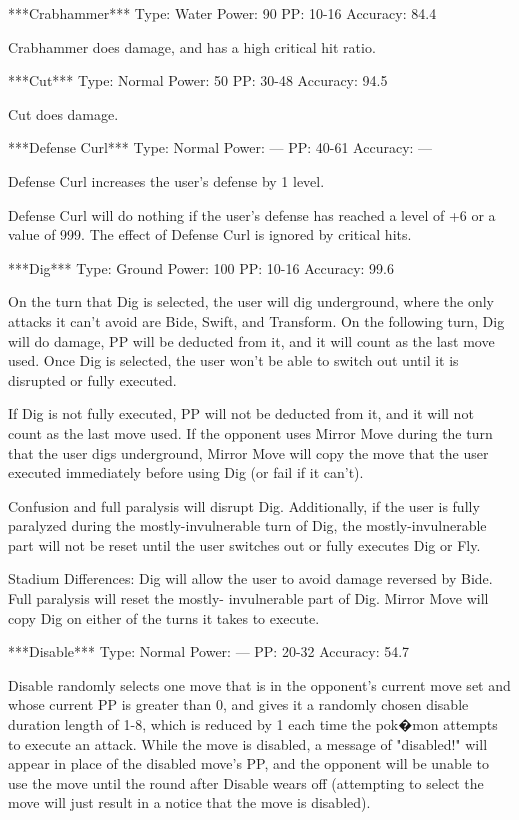 \documentclass[reprint, aps, prl, paper=A4]{revtex4-1}
\begin{document}
***Crabhammer***
Type: Water
Power: 90
PP: 10-16
Accuracy: 84.4%

Crabhammer does damage, and has a high critical hit ratio.


***Cut***
Type: Normal
Power: 50
PP: 30-48
Accuracy: 94.5%

Cut does damage.


***Defense Curl***
Type: Normal
Power: ---
PP: 40-61
Accuracy: ---

Defense Curl increases the user's defense by 1 level.

Defense Curl will do nothing if the user's defense has reached a level of +6 or a value of 999.
The effect of Defense Curl is ignored by critical hits.


***Dig***
Type: Ground
Power: 100
PP: 10-16
Accuracy: 99.6%

On the turn that Dig is selected, the user will dig underground, where the only attacks it
can't avoid are Bide, Swift, and Transform. On the following turn, Dig will do damage, PP will
be deducted from it, and it will count as the last move used. Once Dig is selected, the user
won't be able to switch out until it is disrupted or fully executed.

If Dig is not fully executed, PP will not be deducted from it, and it will not count as the
last move used. If the opponent uses Mirror Move during the turn that the user digs
underground, Mirror Move will copy the move that the user executed immediately before using Dig
(or fail if it can't).

Confusion and full paralysis will disrupt Dig. Additionally, if the user is fully paralyzed
during the mostly-invulnerable turn of Dig, the mostly-invulnerable part will not be reset
until the user switches out or fully executes Dig or Fly.

Stadium Differences:
Dig will allow the user to avoid damage reversed by Bide. Full paralysis will reset the mostly-
invulnerable part of Dig. Mirror Move will copy Dig on either of the turns it takes to execute.


***Disable***
Type: Normal
Power: ---
PP: 20-32
Accuracy: 54.7%

Disable randomly selects one move that is in the opponent's current move set and whose current
PP is greater than 0, and gives it a randomly chosen disable duration length of 1-8, which is
reduced by 1 each time the pok�mon attempts to execute an attack. While the move is disabled, a
message of "disabled!" will appear in place of the disabled move's PP, and the opponent will be
unable to use the move until the round after Disable wears off (attempting to select the move
will just result in a notice that the move is disabled).
\end{document}
